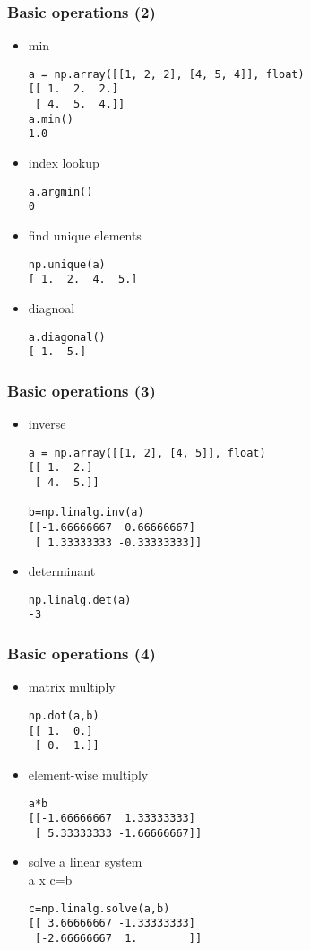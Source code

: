 \documentclass{beamer}
\begin{document}
\begin{frame}[fragile]
\frametitle{Basic operations (2)}
\begin{itemize}
\item min
\begin{lstlisting}
a = np.array([[1, 2, 2], [4, 5, 4]], float)
[[ 1.  2.  2.]
 [ 4.  5.  4.]]
a.min()
1.0
\end{lstlisting}
\item index lookup
\begin{lstlisting}
a.argmin()
0
\end{lstlisting}
\item find unique elements
\begin{lstlisting}
np.unique(a)
[ 1.  2.  4.  5.]
\end{lstlisting}
\item diagnoal
\begin{lstlisting}
a.diagonal()
[ 1.  5.]
\end{lstlisting}
\end{itemize}
\end{frame}

\begin{frame}[fragile]
\frametitle{Basic operations (3)}
\begin{itemize}
\item inverse
\begin{lstlisting}
a = np.array([[1, 2], [4, 5]], float)
[[ 1.  2.]
 [ 4.  5.]]

b=np.linalg.inv(a)
[[-1.66666667  0.66666667]
 [ 1.33333333 -0.33333333]]
\end{lstlisting}
\item determinant
\begin{lstlisting}
np.linalg.det(a)
-3
\end{lstlisting}
\end{itemize}
\end{frame}

\begin{frame}[fragile]
\frametitle{Basic operations (4)}
\begin{itemize}
\item matrix multiply
\begin{lstlisting}
np.dot(a,b)
[[ 1.  0.]
 [ 0.  1.]]
\end{lstlisting}
\item element-wise multiply
\begin{lstlisting}
a*b
[[-1.66666667  1.33333333]
 [ 5.33333333 -1.66666667]]
\end{lstlisting}
\item solve a linear system \\
a x c=b
\begin{lstlisting}
c=np.linalg.solve(a,b)
[[ 3.66666667 -1.33333333]
 [-2.66666667  1.        ]]
\end{lstlisting}
\end{itemize}
\end{frame}
\end{document}
